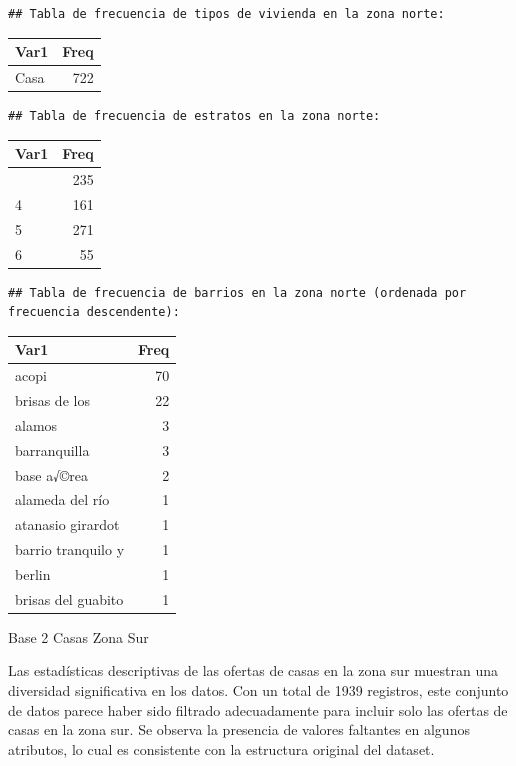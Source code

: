 \documentclass[
]{article}
\begin{document}
\begin{verbatim}
## Tabla de frecuencia de tipos de vivienda en la zona norte:
\end{verbatim}

\begin{longtable}[]{@{}lr@{}}
\toprule\noalign{}
Var1 & Freq \\
\midrule\noalign{}
\endhead
\bottomrule\noalign{}
\endlastfoot
Casa & 722 \\
\end{longtable}

\begin{verbatim}
## Tabla de frecuencia de estratos en la zona norte:
\end{verbatim}

\begin{longtable}[]{@{}lr@{}}
\toprule\noalign{}
Var1 & Freq \\
\midrule\noalign{}
\endhead
\bottomrule\noalign{}
\endlastfoot
3 & 235 \\
4 & 161 \\
5 & 271 \\
6 & 55 \\
\end{longtable}

\begin{verbatim}
## Tabla de frecuencia de barrios en la zona norte (ordenada por frecuencia descendente):
\end{verbatim}

\begin{longtable}[]{@{}lr@{}}
\toprule\noalign{}
Var1 & Freq \\
\midrule\noalign{}
\endhead
\bottomrule\noalign{}
\endlastfoot
acopi & 70 \\
brisas de los & 22 \\
alamos & 3 \\
barranquilla & 3 \\
base a√©rea & 2 \\
alameda del río & 1 \\
atanasio girardot & 1 \\
barrio tranquilo y & 1 \\
berlin & 1 \\
brisas del guabito & 1 \\
\end{longtable}

Base 2 Casas Zona Sur

Las estadísticas descriptivas de las ofertas de casas en la zona sur
muestran una diversidad significativa en los datos. Con un total de 1939
registros, este conjunto de datos parece haber sido filtrado
adecuadamente para incluir solo las ofertas de casas en la zona sur. Se
observa la presencia de valores faltantes en algunos atributos, lo cual
es consistente con la estructura original del dataset.
\end{document}
